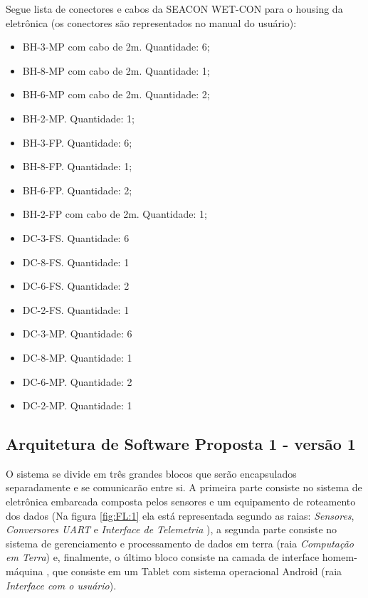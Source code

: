 Segue lista de conectores e cabos da SEACON WET-CON para o housing da
eletrônica (os conectores são representados no manual do usuário):
\begin{itemize}
  \item BH-3-MP com cabo de 2m. Quantidade: 6;
  \item BH-8-MP com cabo de 2m. Quantidade: 1;
  \item BH-6-MP com cabo de 2m. Quantidade: 2;
  \item BH-2-MP. Quantidade: 1;
  \item BH-3-FP. Quantidade: 6;
  \item BH-8-FP. Quantidade: 1;
  \item BH-6-FP. Quantidade: 2;
  \item BH-2-FP com cabo de 2m. Quantidade: 1;
  \item DC-3-FS. Quantidade: 6
\item DC-8-FS. Quantidade: 1	
\item DC-6-FS. Quantidade: 2
\item DC-2-FS. Quantidade: 1
\item DC-3-MP. Quantidade: 6
\item DC-8-MP. Quantidade: 1
\item DC-6-MP. Quantidade: 2
\item DC-2-MP. Quantidade: 1   
\end{itemize}

\subsection{Arquitetura de Software Proposta 1 - versão 1}
O sistema se divide em três grandes blocos que serão encapsulados separadamente
e se comunicarão entre si. A primeira parte consiste no
sistema de eletrônica embarcada composta pelos sensores e um equipamento de
roteamento dos dados (Na figura \ref{fig:FL:1} ela está representada segundo as
raias: \emph{Sensores}, \emph{Conversores UART} e \emph{Interface de Telemetria}
), a segunda parte consiste no sistema de gerenciamento e processamento de dados em terra (raia \emph{Computação em
Terra}) e, finalmente, o último bloco consiste na camada de interface
homem-máquina , que consiste em um Tablet com sistema operacional Android (raia
\emph{Interface com o usuário}).

